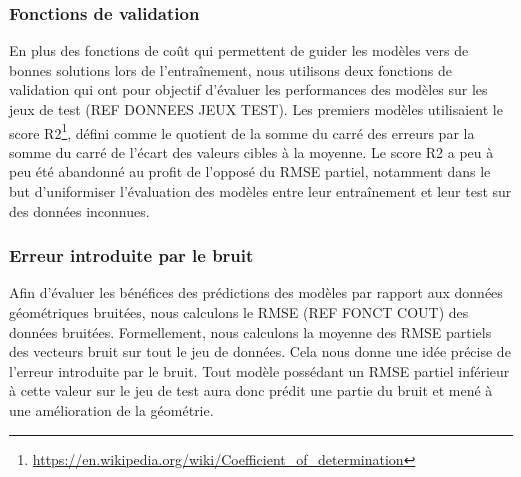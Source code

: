 \subsubsection{Fonctions de validation}

\par En plus des fonctions de coût qui permettent de guider les modèles vers de bonnes solutions lors de l'entraînement, nous utilisons deux fonctions de validation qui ont pour objectif d'évaluer les performances des modèles sur les jeux de test (REF DONNEES JEUX TEST). Les premiers modèles utilisaient le score R2\footnote{\url{https://en.wikipedia.org/wiki/Coefficient_of_determination}}, défini comme le quotient de la somme du carré des erreurs par la somme du carré de l'écart des valeurs cibles à la moyenne. Le score R2 a peu à peu été abandonné au profit de l'opposé du RMSE partiel, notamment dans le but d'uniformiser l'évaluation des modèles entre leur entraînement et leur test sur des données inconnues.

\subsubsection{Erreur introduite par le bruit}

\par Afin d'évaluer les bénéfices des prédictions des modèles par rapport aux données géométriques bruitées, nous calculons le RMSE (REF FONCT COUT) des données bruitées. Formellement, nous calculons la moyenne des RMSE partiels des vecteurs bruit sur tout le jeu de données. Cela nous donne une idée précise de l'erreur introduite par le bruit. Tout modèle possédant un RMSE partiel inférieur à cette valeur sur le jeu de test aura donc prédit une partie du bruit et mené à une amélioration de la géométrie.

